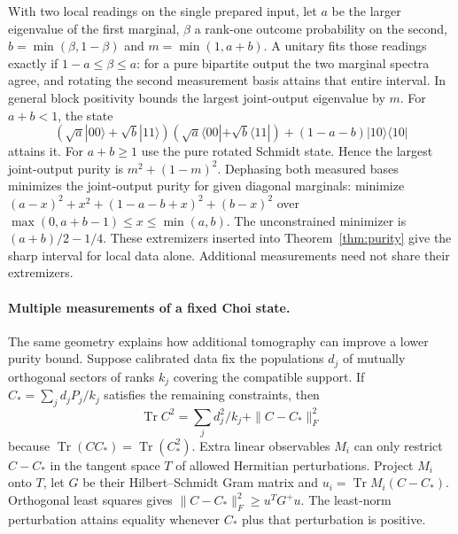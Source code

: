 \documentclass[11pt,letterpaper]{article}
\newcommand{\tr}{\operatorname{Tr}}\newcommand{\TV}{\operatorname{TV}}\newcommand{\E}{\mathbb E}\newcommand{\id}{\mathbb I}\newcommand{\calB}{\mathcal B}\newcommand{\norm}[1]{\left\lVert#1\right\rVert}
\begin{document}
With two local readings on the single prepared input, let $a$ be the larger eigenvalue of the first marginal, $\beta$ a rank-one outcome probability on the second, $b=\min(\beta,1-\beta)$ and $m=\min(1,a+b)$. A unitary fits those readings exactly if $1-a\le\beta\le a$: for a pure bipartite output the two marginal spectra agree, and rotating the second measurement basis attains that entire interval. In general block positivity bounds the largest joint-output eigenvalue by $m$. For $a+b<1$, the state
\[
 (\sqrt a|00\rangle+\sqrt b|11\rangle)(\sqrt a\langle00|+\sqrt b\langle11|)
 +(1-a-b)|10\rangle\langle10|
\]
attains it. For $a+b\ge1$ use the pure rotated Schmidt state. Hence the largest joint-output purity is $m^2+(1-m)^2$. Dephasing both measured bases minimizes the joint-output purity for given diagonal marginals: minimize
$(a-x)^2+x^2+(1-a-b+x)^2+(b-x)^2$
over $\max(0,a+b-1)\le x\le\min(a,b)$. The unconstrained minimizer is $(a+b)/2-1/4$. These extremizers inserted into Theorem~\ref{thm:purity} give the sharp interval for local data alone. Additional measurements need not share their extremizers.

\paragraph{Multiple measurements of a fixed Choi state.}
The same geometry explains how additional tomography can improve a lower purity bound. Suppose calibrated data fix the populations $d_j$ of mutually orthogonal sectors of ranks $k_j$ covering the compatible support. If $C_*=\sum_j d_jP_j/k_j$ satisfies the remaining constraints, then
\[
 \tr C^2=\sum_j d_j^2/k_j+\|C-C_*\|_F^2
\]
because $\tr(CC_*)=\tr(C_*^2)$. Extra linear observables $M_i$ can only restrict $C-C_*$ in the tangent space $T$ of allowed Hermitian perturbations. Project $M_i$ onto $T$, let $G$ be their Hilbert–Schmidt Gram matrix and $u_i=\tr M_i(C-C_*)$. Orthogonal least squares gives $\|C-C_*\|_F^2\ge u^TG^+u$. The least-norm perturbation attains equality whenever $C_*$ plus that perturbation is positive.
\end{document}
